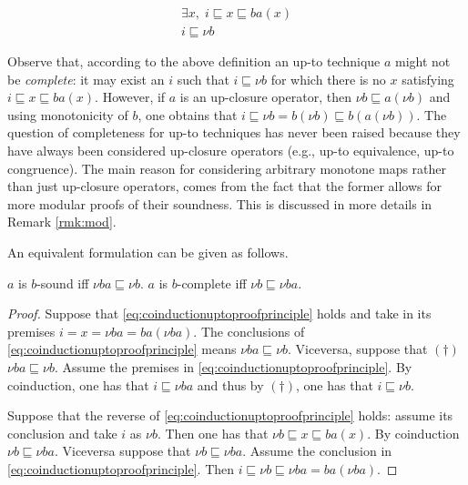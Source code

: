 \documentclass{llncs}
\begin{document}
\begin{equation}\label{eq:coinductionuptoproofprinciple}
 \begin{array}{c}
    \exists x, \; i \sqsubseteq x\sqsubseteq ba(x)\\
    \hline %
    i \sqsubseteq \nu b
\end{array}
\end{equation}

\begin{remark}\label{rmk:completenessupto}
Observe that, according to the above definition an up-to technique $a$ might not be \emph{complete}: it may exist an $i$ such that $i \sqsubseteq \nu b$ for which there is no $x$ satisfying  $i \sqsubseteq x\sqsubseteq ba(x)$. However, if $a$ is an up-closure operator, then $\nu b  \sqsubseteq a(\nu b)$ and using monotonicity of $b$, one obtains that 
$i \sqsubseteq \nu b = b(\nu b) \sqsubseteq b(a (\nu b))$. The question of completeness for up-to techniques has never been raised because they have always been considered up-closure operators (e.g., up-to equivalence, up-to congruence). The main reason for considering arbitrary monotone maps rather than just up-closure operators, comes from the fact that the former allows for more modular proofs of their soundness. This is discussed in more details in Remark \ref{rmk:mod}.
\end{remark}
%
An equivalent formulation can be given as follows.  

\begin{lemma}
$a$ is $b$-sound iff $\nu ba \sqsubseteq \nu b$. $a$ is $b$-complete iff   $\nu b \sqsubseteq \nu ba$.
\end{lemma}
\begin{proof}
Suppose that \eqref{eq:coinductionuptoproofprinciple} holds and take in its premises $i=x=\nu ba=ba(\nu ba)$. The conclusions of \eqref{eq:coinductionuptoproofprinciple} means $\nu ba \sqsubseteq \nu b$. Viceversa, suppose that $(\dag)$ $\nu ba \sqsubseteq \nu b$. Assume the premises in \eqref{eq:coinductionuptoproofprinciple}. By coinduction, one has that $i\sqsubseteq \nu ba$ and thus by $(\dag)$, one has that $i\sqsubseteq \nu b$. 

Suppose that the reverse of \eqref{eq:coinductionuptoproofprinciple} holds: assume its conclusion and take $i$ as $\nu b$. Then one has that $\nu b \sqsubseteq x \sqsubseteq ba(x)$. By coinduction $\nu b \sqsubseteq \nu ba$.
Viceversa suppose that $\nu b \sqsubseteq \nu ba$. Assume the conclusion in  \eqref{eq:coinductionuptoproofprinciple}. Then $i\sqsubseteq \nu b \sqsubseteq\nu ba = ba(\nu ba) $.
\end{proof}
\end{document}
